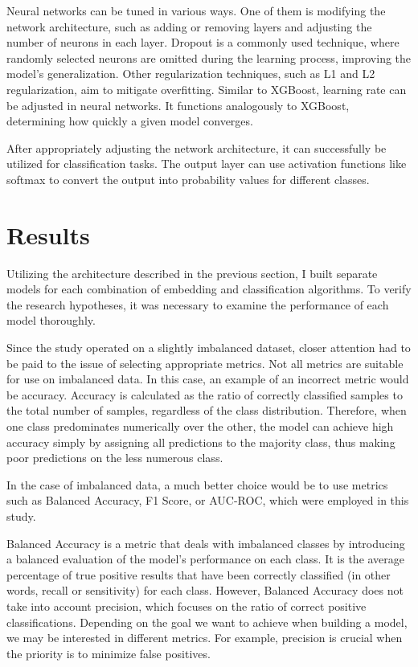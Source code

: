 Neural networks can be tuned in various ways. One of them is modifying the network architecture, such as adding or removing layers and adjusting the number of neurons in each layer. Dropout is a commonly used technique, where randomly selected neurons are omitted during the learning process, improving the model's generalization. Other regularization techniques, such as L1 and L2 regularization, aim to mitigate overfitting. Similar to XGBoost, learning rate can be adjusted in neural networks. It functions analogously to XGBoost, determining how quickly a given model converges.

After appropriately adjusting the network architecture, it can successfully be utilized for classification tasks. The output layer can use activation functions like softmax to convert the output into probability values for different classes.


\section{Results}
Utilizing the architecture described in the previous section, I built separate models for each combination of embedding and classification algorithms. To verify the research hypotheses, it was necessary to examine the performance of each model thoroughly.

Since the study operated on a slightly imbalanced dataset, closer attention had to be paid to the issue of selecting appropriate metrics. Not all metrics are suitable for use on imbalanced data. In this case, an example of an incorrect metric would be accuracy. Accuracy is calculated as the ratio of correctly classified samples to the total number of samples, regardless of the class distribution. Therefore, when one class predominates numerically over the other, the model can achieve high accuracy simply by assigning all predictions to the majority class, thus making poor predictions on the less numerous class.

In the case of imbalanced data, a much better choice would be to use metrics such as Balanced Accuracy, F1 Score, or AUC-ROC, which were employed in this study.

Balanced Accuracy is a metric that deals with imbalanced classes by introducing a balanced evaluation of the model's performance on each class. It is the average percentage of true positive results that have been correctly classified (in other words, recall or sensitivity) for each class. However, Balanced Accuracy does not take into account precision, which focuses on the ratio of correct positive classifications. Depending on the goal we want to achieve when building a model, we may be interested in different metrics. For example, precision is crucial when the priority is to minimize false positives.

